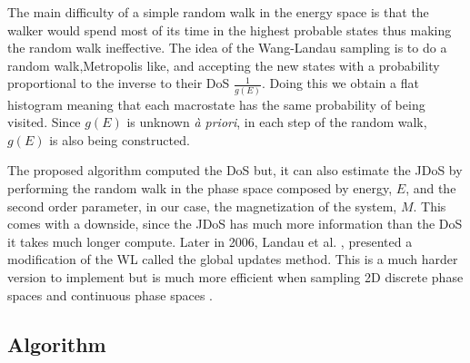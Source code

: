 The main difficulty of a simple random walk in the energy space is that the walker would spend most of its time in the highest probable states thus making the random walk ineffective. The idea of the Wang-Landau sampling is to do a random walk,Metropolis like, and accepting the new states with a probability proportional to the inverse to their DoS $\frac{1}{g(E)}$. Doing this we obtain a flat histogram meaning that each macrostate has the same probability of being visited.  
Since $g(E)$ is unknown \textit{à priori}, in each step of the random walk, $g(E)$ is also being constructed.

The proposed algorithm computed the DoS but, it can also estimate the JDoS by performing the random walk in the phase space composed by energy, $E$, and the second order parameter, in our case, the magnetization of the system, $M$. This comes with a downside, since the JDoS has much more information than the DoS it takes much longer compute.
Later in 2006, Landau et al. \cite{WL_Cont}, presented a modification of the WL called the global updates method. This is a much harder version to implement but is much more efficient when sampling 2D discrete phase spaces and continuous phase spaces \cite{Poulain2006}.  

\subsection{Algorithm}

